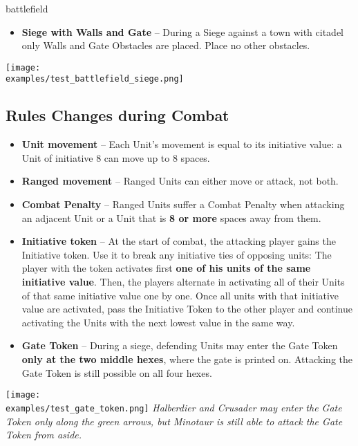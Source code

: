 \newpage
\begin{expansion}{battlefield}
  \begin{multicols*}{2}
  \begin{itemize}
  	\item \textbf{Siege with Walls and Gate} – During a Siege against a town with citadel only Walls and Gate Obstacles are placed. Place no other obstacles.
  \end{itemize}
  \texttt{[image: \\examples/test\_battlefield\_siege.png]}
  \subsection*{Rules Changes during Combat}
  \begin{itemize}
  	\item \textbf{Unit movement} – Each Unit's movement is equal to its initiative value: a Unit of initiative 8 can move up to 8 spaces.
  	\item \textbf{Ranged movement}  – Ranged  Units can either move or attack, not both.
    \item \textbf{Combat Penalty} – Ranged  Units suffer a Combat Penalty when attacking an adjacent Unit or a Unit that is \textbf{8 or more} spaces away from them.
    \columnbreak
  	\item \textbf{Initiative token} – At the start of combat, the attacking player gains the Initiative token.
  	Use it to break any initiative ties of opposing units: The player with the token activates first \textbf{one of his units of the same initiative value}.
  	Then, the players alternate in activating all of their Units of that same initiative value one by one.
  	Once all units with that initiative value are activated, pass the Initiative Token to the other player and continue activating the Units with the next lowest value in the same way.
  	\item \textbf{Gate Token} – During a siege, defending Units may enter the Gate Token \textbf{only at the two middle hexes}, where the gate is printed on. Attacking the Gate Token is still possible on all four hexes.
  \end{itemize}
  \texttt{[image: \\examples/test\_gate\_token.png]}
  \vspace*{1em}
  \footnotesize\textit{Halberdier and Crusader may enter the Gate Token only along the green arrows, but Minotaur is still able to attack the Gate Token from aside.}
  \end{multicols*}
\end{expansion}

